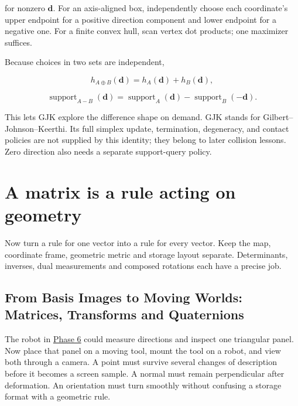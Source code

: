 for nonzero \(\mathbf d\). For an axis-aligned box, independently choose each coordinate's upper endpoint for a positive direction component and lower endpoint for a negative one. For a finite convex hull, scan vertex dot products; one maximizer suffices.

Because choices in two sets are independent,

\[
h_{A\oplus B}(\mathbf d)=h_A(\mathbf d)+h_B(\mathbf d),
\]

\[
\operatorname{support}_{A-B}(\mathbf d)
=\operatorname{support}_A(\mathbf d)-\operatorname{support}_B(-\mathbf d).
\]

This lets GJK explore the difference shape on demand. GJK stands for Gilbert--Johnson--Keerthi. Its full simplex update, termination, degeneracy, and contact policies are not supplied by this identity; they belong to later collision lessons. Zero direction also needs a separate support-query policy.

\section{A matrix is a rule acting on geometry}\label{01-foundations-i-ch018-a-matrix-is-a-rule-acting-on-geometry}

\hypertarget{01-foundations-i-ch018-a-matrix-is-a-rule-acting-on-geometry}{}

Now turn a rule for one vector into a rule for every vector. Keep the map, coordinate frame, geometric metric and storage layout separate. Determinants, inverses, dual measurements and composed rotations each have a precise job.

\subsection{From Basis Images to Moving Worlds: Matrices, Transforms and Quaternions}\label{01-foundations-i-ch018-from-basis-images-to-moving-worlds-matrices-transforms-and-quaternions}

\hypertarget{01-foundations-i-ch018-from-basis-images-to-moving-worlds-matrices-transforms-and-quaternions}{}

The robot in \hyperref[01-foundations-i-ch017-the-panel-gives-us-a-reason-to-learn]{Phase 6} could measure directions and inspect one triangular panel. Now place that panel on a moving tool, mount the tool on a robot, and view both through a camera. A point must survive several changes of description before it becomes a screen sample. A normal must remain perpendicular after deformation. An orientation must turn smoothly without confusing a storage format with a geometric rule.

